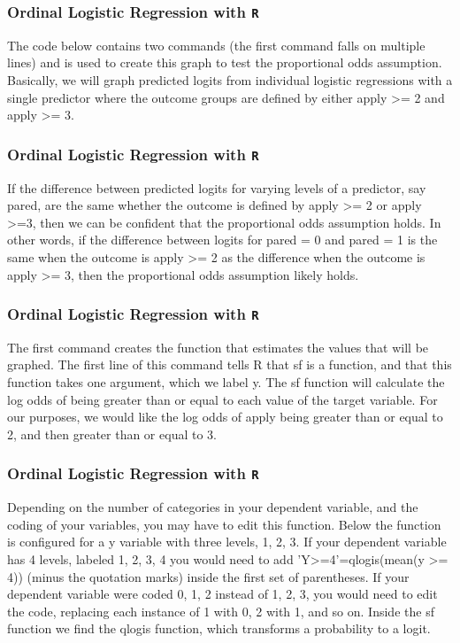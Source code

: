 \begin{frame}[fragile]

\frametitle{Ordinal Logistic Regression with \texttt{R}}
\Large
The code below contains two commands (the first command falls on multiple lines) and is used to create this graph to test the proportional odds assumption. Basically, we will graph predicted logits from individual logistic regressions with a single predictor where the outcome groups are defined by either apply >= 2 and apply >= 3. 

\end{frame}
\begin{frame}[fragile]

\frametitle{Ordinal Logistic Regression with \texttt{R}}
\Large

If the difference between predicted logits for varying levels of a predictor, say pared, are the same whether the outcome is defined by apply >= 2 or apply >=3, then we can be confident that the proportional odds assumption holds. In other words, if the difference between logits for pared = 0 and pared = 1 is the same when the outcome is apply >= 2 as the difference when the outcome is apply >= 3, then the proportional odds assumption likely holds.

\end{frame}
\begin{frame}[fragile]

\frametitle{Ordinal Logistic Regression with \texttt{R}}
\Large
The first command creates the function that estimates the values that will be graphed. The first line of this command tells R that sf is a function, and that this function takes one argument, which we label y. The sf function will calculate the log odds of being greater than or equal to each value of the target variable. For our purposes, we would like the log odds of apply being greater than or equal to 2, and then greater than or equal to 3. 

\end{frame}
\begin{frame}[fragile]

\frametitle{Ordinal Logistic Regression with \texttt{R}}
\Large

Depending on the number of categories in your dependent variable, and the coding of your variables, you may have to edit this function. Below the function is configured for a y variable with three levels, 1, 2, 3. If your dependent variable has 4 levels, labeled 1, 2, 3, 4 you would need to add 'Y>=4'=qlogis(mean(y >= 4)) (minus the quotation marks) inside the first set of parentheses. If your dependent variable were coded 0, 1, 2 instead of 1, 2, 3, you would need to edit the code, replacing each instance of 1 with 0, 2 with 1, and so on. Inside the sf function we find the qlogis function, which transforms a probability to a logit. 

\end{frame}
